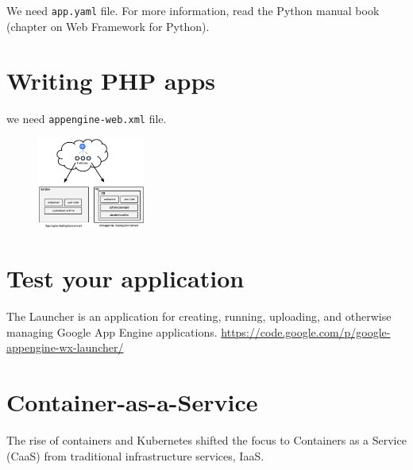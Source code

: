 We need \verb!app.yaml! file. For more information, read the Python manual book 
(chapter on Web Framework for Python).

\section{Writing PHP apps}

we need \verb!appengine-web.xml! file. 

\begin{figure}[hbt]
  \centerline{\includegraphics[height=3cm,
    angle=0]{./images/GoogleCloudPlatform_environment.eps}}
  \caption{}
  \label{fig:GoogleCloudPlatform_environment}
\end{figure}


\section{Test your application}

The Launcher is an application for creating, running, uploading, and otherwise
managing Google App Engine applications. 
\url{https://code.google.com/p/google-appengine-wx-launcher/}

\section{Container-as-a-Service}

 The rise of containers and Kubernetes shifted the focus to Containers as a Service (CaaS) from traditional infrastructure services, IaaS. 
 





